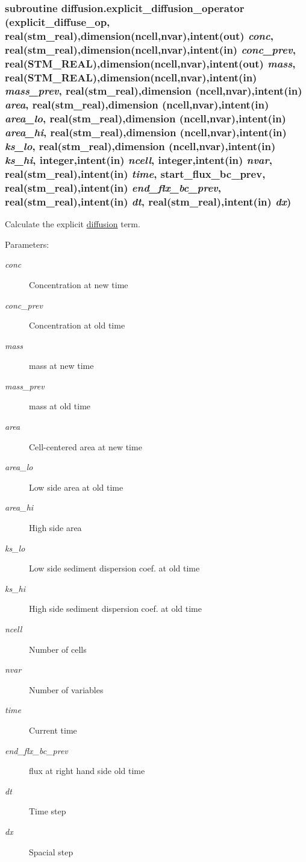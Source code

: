 \hypertarget{a00027_9da6bb8848c4bfaf6b6a8f4cb4d4dd9c}{
\subsubsection[{explicit\_\-diffusion\_\-operator}]{\setlength{\rightskip}{0pt plus 5cm}subroutine diffusion.explicit\_\-diffusion\_\-operator (explicit\_\-diffuse\_\-op, \/  real(stm\_\-real),dimension(ncell,nvar),intent(out) {\em conc}, \/  real(stm\_\-real),dimension(ncell,nvar),intent(in) {\em conc\_\-prev}, \/  real(STM\_\-REAL),dimension(ncell,nvar),intent(out) {\em mass}, \/  real(STM\_\-REAL),dimension(ncell,nvar),intent(in) {\em mass\_\-prev}, \/  real(stm\_\-real),dimension (ncell,nvar),intent(in) {\em area}, \/  real(stm\_\-real),dimension (ncell,nvar),intent(in) {\em area\_\-lo}, \/  real(stm\_\-real),dimension (ncell,nvar),intent(in) {\em area\_\-hi}, \/  real(stm\_\-real),dimension (ncell,nvar),intent(in) {\em ks\_\-lo}, \/  real(stm\_\-real),dimension (ncell,nvar),intent(in) {\em ks\_\-hi}, \/  integer,intent(in) {\em ncell}, \/  integer,intent(in) {\em nvar}, \/  real(stm\_\-real),intent(in) {\em time}, \/  start\_\-flux\_\-bc\_\-prev, \/  real(stm\_\-real),intent(in) {\em end\_\-flx\_\-bc\_\-prev}, \/  real(stm\_\-real),intent(in) {\em dt}, \/  real(stm\_\-real),intent(in) {\em dx})}}
\label{a00027_9da6bb8848c4bfaf6b6a8f4cb4d4dd9c}


Calculate the explicit \hyperlink{a00027}{diffusion} term. 

\begin{Desc}
\item[Parameters:]
\begin{description}
\item[{\em conc}]Concentration at new time\item[{\em conc\_\-prev}]Concentration at old time\item[{\em mass}]mass at new time\item[{\em mass\_\-prev}]mass at old time\item[{\em area}]Cell-centered area at new time\item[{\em area\_\-lo}]Low side area at old time\item[{\em area\_\-hi}]High side area \item[{\em ks\_\-lo}]Low side sediment dispersion coef. at old time\item[{\em ks\_\-hi}]High side sediment dispersion coef. at old time\item[{\em ncell}]Number of cells\item[{\em nvar}]Number of variables\item[{\em time}]Current time\item[{\em end\_\-flx\_\-bc\_\-prev}]flux at right hand side old time\item[{\em dt}]Time step \item[{\em dx}]Spacial step \end{description}
\end{Desc}
